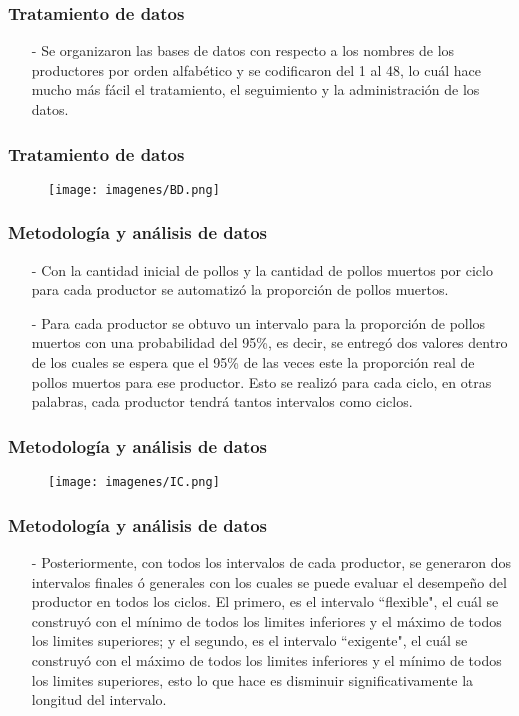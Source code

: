 \documentclass[11pt]{beamer}
\begin{document}
\begin{frame}
\frametitle{Tratamiento de datos}
\begin{itemize}
\justifying
\item[-]Se organizaron las bases de datos con respecto a los nombres de los productores por orden alfabético y se codificaron del 1 al 48, lo cuál hace mucho más fácil el tratamiento, el seguimiento y la administración de los datos.
\end{itemize}
\end{frame}

\begin{frame}
\frametitle{Tratamiento de datos}
\begin{figure}[!h]
        \texttt{[image: imagenes/BD.png]}
        \label{figura1}
\end{figure}
\end{frame}


\begin{frame}
\frametitle{Metodología y análisis de datos}
\begin{itemize}
\justifying
\item[-]Con la cantidad inicial de pollos y la cantidad de pollos muertos por ciclo para cada productor se automatizó la proporción de pollos muertos.
\item[-]Para cada productor se obtuvo un intervalo para la proporción de pollos muertos con una probabilidad del 95\%, es decir, se entregó dos valores dentro de los cuales se espera que el 95\% de las veces este la proporción real de pollos muertos para ese productor. Esto se realizó para cada ciclo, en otras palabras, cada productor tendrá tantos intervalos como ciclos.
\end{itemize}
\end{frame}

\begin{frame}
\frametitle{Metodología y análisis de datos}
\begin{figure}[!h]
        \texttt{[image: imagenes/IC.png]}
        \label{figura1}
\end{figure}
\end{frame}

\begin{frame}
\frametitle{Metodología y análisis de datos}
\begin{itemize}
\justifying
\item[-]Posteriormente, con todos los intervalos de cada productor, se generaron dos intervalos finales ó generales con los cuales se puede evaluar el desempeño del productor en todos los ciclos. El primero, es el intervalo ``flexible", el cuál se construyó con el mínimo de todos los limites inferiores y el máximo de todos los limites superiores; y el segundo, es el intervalo ``exigente", el cuál se construyó con el máximo de todos los limites inferiores y el mínimo de todos los limites superiores, esto lo que hace es disminuir significativamente la longitud del intervalo. 
\end{itemize}
\end{frame}
\end{document}
